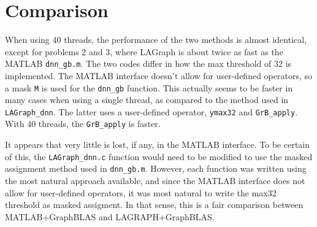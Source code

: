 \documentclass[12pt]{article}
\begin{document}
\section{Comparison}
When using 40 threads, the performance of the two methods is
almost identical, except for problems 2 and 3, where LAGraph
is about twice as fast as the MATLAB \verb'dnn_gb.m'.
The two codes differ in how the max threshold of 32 is implemented.  The MATLAB
interface doesn't allow for user-defined operators, so a mask \verb'M' is used
for the \verb'dnn_gb' function.  This actually seems to be faster in many cases
when using a single thread, as compared to the method used in
\verb'LAGraph_dnn'.  The latter uses a user-defined operator, \verb'ymax32' and
\verb'GrB_apply'.  With 40 threads, the \verb'GrB_apply' is faster.

  It appears
that very little is lost, if any, in the MATLAB interface.  To be certain of
this, the \verb'LAGraph_dnn.c' function would need to be modified to use the
masked assignment method used in \verb'dnn_gb.m'.  However, each function was
written using the most natural approach available, and since the MATLAB
interface does not allow for user-defined operators, it was most natural to
write the max32 threshold as masked assigment.  In that sense, this is a
fair comparison between MATLAB+GraphBLAS and LAGRAPH+GraphBLAS.
\end{document}
